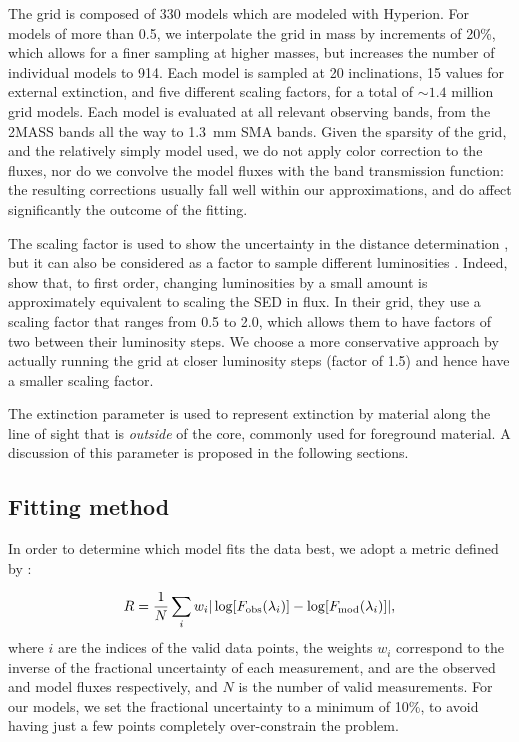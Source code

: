 The grid is composed of 330 models which are modeled with Hyperion. For models of more than \SI{0.5}{\Msun}, we interpolate the grid in mass by increments of 20\%, which allows for a finer sampling at higher masses, but increases the number of individual models to 914. Each model is sampled at 20 inclinations, 15 values for external extinction, and five different scaling factors, for a total of $\sim 1.4$ million grid models. Each model is evaluated at all relevant observing bands, from the 2MASS bands all the way to \SI{1.3}{\milli\meter} SMA bands. Given the sparsity of the grid, and the relatively simply model used, we do not apply color correction to the fluxes, nor do we convolve the model fluxes with the band transmission function: the resulting corrections usually fall well within our approximations, and do affect significantly the outcome of the fitting.

The scaling factor is used to show the uncertainty in the distance determination \citep{Robitaille:2006cb}, but it can also be considered as a factor to sample different luminosities \citep{Furlan:2016df}. Indeed, \citet{Furlan:2016df} show that, to first order, changing luminosities by a small amount is approximately equivalent to scaling the SED in flux. In their grid, they use a scaling factor that ranges from 0.5 to 2.0, which allows them to have factors of two between their luminosity steps. We choose a more conservative approach  by actually running the grid at closer luminosity steps (factor of 1.5) and hence have a smaller scaling factor. 

The extinction parameter is used to represent extinction by material along the line of sight that is \textit{outside} of the core, commonly used for foreground material. A discussion of this parameter is proposed in the following sections.



\subsection{Fitting method}

In order to determine which model fits the data best, we adopt a metric defined by \citet{Fischer:2012dj}:

\begin{equation}
R = \frac{1}{N}\sum_i w_i|\log[F_\textrm{obs}(\lambda_i)] - \log[F_\textrm{mod}(\lambda_i)]|,
\end{equation}
where $i$ are the indices of the valid data points, the weights $w_i$ correspond to the inverse of the fractional uncertainty of each measurement, \Fobs and \Fmod are the observed and model fluxes respectively, and $N$ is the number of valid measurements. For our models, we set the fractional uncertainty to a minimum of 10\%, to avoid having just a few points completely over-constrain the problem.

